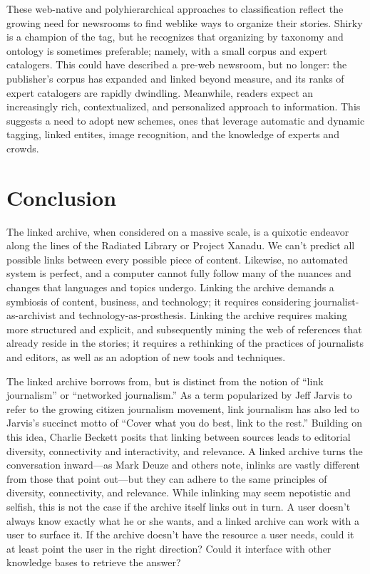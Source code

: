 These web-native and polyhierarchical approaches to classification reflect the growing need for newsrooms to find weblike ways to organize their stories. Shirky is a champion of the tag, but he recognizes that organizing by taxonomy and ontology is sometimes preferable; namely, with a small corpus and expert catalogers.\autocite{shirky_ontology_2005} This could have described a pre-web newsroom, but no longer: the publisher's corpus has expanded and linked beyond measure, and its ranks of expert catalogers are rapidly dwindling. Meanwhile, readers expect an increasingly rich, contextualized, and personalized approach to information. This suggests a need to adopt new schemes, ones that leverage automatic and dynamic tagging, linked entites, image recognition, and the knowledge of experts and crowds.

\section{Conclusion}

The linked archive, when considered on a massive scale, is a quixotic endeavor along the lines of the Radiated Library or Project Xanadu. We can't predict all possible links between every possible piece of content. Likewise, no automated system is perfect, and a computer cannot fully follow many of the nuances and changes that languages and topics undergo. Linking the archive demands a symbiosis of content, business, and technology; it requires considering journalist-as-archivist and technology-as-prosthesis. Linking the archive requires making more structured and explicit, and subsequently mining the web of references that already reside in the stories; it requires a rethinking of the practices of journalists and editors, as well as an adoption of new tools and techniques.

The linked archive borrows from, but is distinct from the notion of ``link journalism'' or ``networked journalism.'' As a term popularized by Jeff Jarvis to refer to the growing citizen journalism movement, link journalism has also led to Jarvis's succinct motto of ``Cover what you do best, link to the rest.''\autocites{jarvis_new_2007}{jarvis_networked_2006} Building on this idea, Charlie Beckett posits that linking between sources leads to editorial diversity, connectivity and interactivity, and relevance.\autocite{beckett_editorial_2010} A linked archive turns the conversation inward---as Mark Deuze and others note, inlinks are vastly different from those that point out---but they can adhere to the same principles of diversity, connectivity, and relevance. While inlinking may seem nepotistic and selfish, this is not the case if the archive itself links out in turn.  A user doesn't always know exactly what he or she wants, and a linked archive can work with a user to surface it. If the archive doesn't have the resource a user needs, could it at least point the user in the right direction? Could it interface with other knowledge bases to retrieve the answer?

